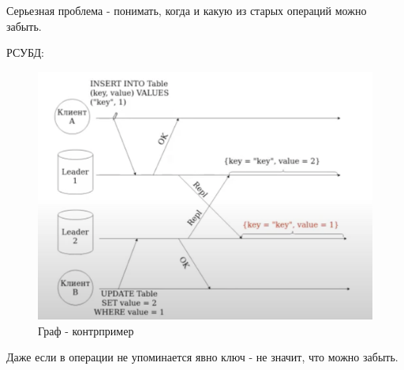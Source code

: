     \begin{definition}
      Серьезная проблема - понимать, когда и какую из старых операций можно забыть.
    \end{definition}
    \begin{example}
      РСУБД:\\
      \begin{figure}[h]
          \centering
          \includegraphics[scale = 0.5]{../assets/14.png}
          \caption{Граф - контрпример}
      \end{figure}
      Даже если в операции не упоминается явно ключ - не значит, что можно забыть.\\
    \end{example}
